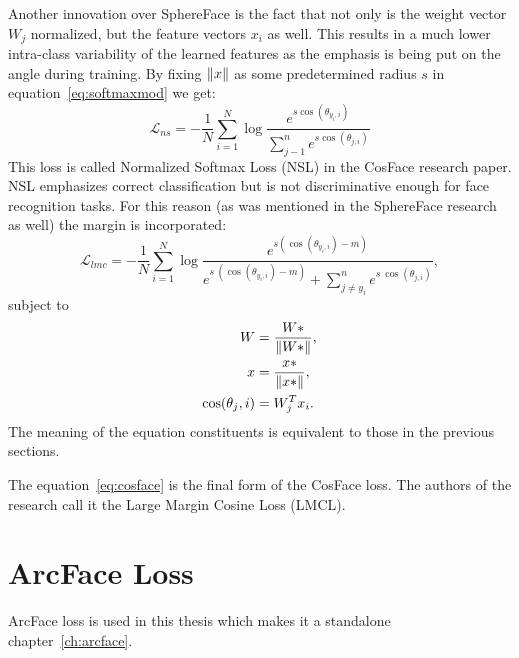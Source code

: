 Another innovation over SphereFace is the fact that not only is the weight vector $W_j$ normalized, but the feature
vectors $x_i$ as well.
This results in a much lower intra-class variability of the learned features as the emphasis is being put on the
angle during training.
By fixing $\left\lVert x\right\rVert$ as some predetermined radius $s$ in equation~\ref{eq:softmaxmod} we get:
\begin{equation}
    \mathcal{L}_{ns} = -\frac{1}{N} \sum_{i=1}^{N} \log \frac{e^{s \cos(\theta_{y_i,i})}}
    {\sum_{j-1}^{n} e^{s \cos(\theta_{j,i})}}
\end{equation}
This loss is called Normalized Softmax Loss (NSL) in the CosFace research paper.
NSL emphasizes correct classification but is not discriminative enough for face recognition tasks.
For this reason (as was mentioned in the SphereFace research as well) the margin is incorporated:
\begin{equation}
    \label{eq:cosface}
    \mathcal{L}_{lmc} = -\frac{1}{N} \sum_{i=1}^{N} \log \frac{e^{s \left( \cos(\theta_{y_i,i}) - m \right)}}
    {e^{s\ \left( \cos(\theta_{y_i,i}) - m \right)} + \sum_{j \neq y_i}^n e^{s\ \cos(\theta_{j,i})}},
\end{equation}
subject to
\begin{align}
    W &= \frac{W*}{\left\lVert W*\right\rVert}, \\
    x &= \frac{x*}{\left\lVert x*\right\rVert}, \\
    \cos(\theta_j, i) &= W_{j}^T x_i.
\end{align}
The meaning of the equation constituents is equivalent to those in the previous sections.

The equation~\ref{eq:cosface} is the final form of the CosFace loss.
The authors of the research call it the Large Margin Cosine Loss (LMCL).

\section{ArcFace Loss}\label{sec:arcface}
ArcFace loss is used in this thesis which makes it a standalone chapter~\ref{ch:arcface}.